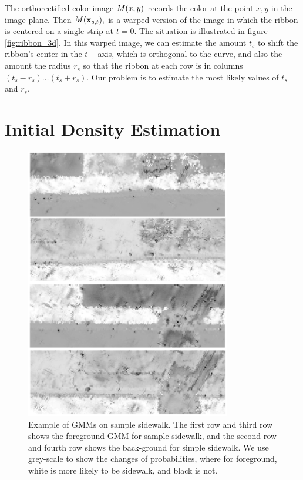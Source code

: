 The orthorectified color image $M(x,y)$
records the color at the point $x,y$ in the image plane.
Then $M(\mathbf{x}_{s,t}),$ is a warped version of the image in which the ribbon is centered on a single strip at $t=0$.
The situation is illustrated in figure  \ref{fig:ribbon_3d}.  
In this warped image, we can estimate the amount $t_s$ to shift the ribbon's center in the $t-$axis, which is orthogonal to the curve,  and also the amount the radius $r_s$ so that the  ribbon at each row is in columns $(t_s - r_s)\dots(t_s+r_s)$.  
Our problem is to estimate the most likely values of $t_s$ and $r_s$.  


\section{Initial Density Estimation}

\begin{figure}[H]
    \centering
    \includegraphics[width=0.8\textwidth]{Figures/gmm_sample_1.png}
    \caption[\ac{GMM} Result 1]{Example of GMMs on sample sidewalk. The first row and third row shows the foreground GMM for sample sidewalk, and the second row and fourth row shows the back-ground for simple sidewalk. We use grey-scale to show the changes of probabilities, where for foreground, white is more likely to be sidewalk, and black is not.}
    \label{fig:GMM_result}
\end{figure}



